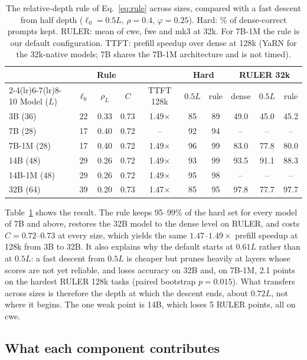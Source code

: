 \documentclass[10pt,conference]{IEEEtran}
\begin{document}
\begin{table}[t]
\centering
\caption{The relative-depth rule of Eq.~\eqref{eq:rule} across sizes, compared with a fast descent from half depth ($\ell_0=0.5L$, $\rho=0.4$, $\varphi=0.25$). Hard: \% of dense-correct prompts kept. RULER: mean of cwe, fwe and mk3 at 32k. For 7B-1M the rule is our default configuration. TTFT: prefill speedup over dense at 128k (YaRN for the 32k-native models; 7B shares the 7B-1M architecture and is not timed).}
\label{tab:rule}
\setlength{\tabcolsep}{5pt}
\small
\begin{tabular}{l ccc c cc ccc}
\toprule
& \multicolumn{3}{c}{Rule} & & \multicolumn{2}{c}{Hard} & \multicolumn{3}{c}{RULER 32k} \\
\cmidrule(lr){2-4}\cmidrule(lr){6-7}\cmidrule(lr){8-10}
Model ($L$) & $\ell_0$ & $\rho_L$ & $C$ & TTFT 128k & $0.5L$ & rule & dense & $0.5L$ & rule \\
\midrule
3B (36) & 22 & 0.33 & 0.73 & 1.49$\times$ & 85 & 89 & 49.0 & 45.0 & 45.2 \\
7B (28) & 17 & 0.40 & 0.72 & -- & 92 & 94 & -- & -- & -- \\
7B-1M (28) & 17 & 0.40 & 0.72 & 1.49$\times$ & 96 & 99 & 83.0 & 77.8 & 80.0 \\
14B (48) & 29 & 0.26 & 0.72 & 1.49$\times$ & 93 & 99 & 93.5 & 91.1 & 88.3 \\
14B-1M (48) & 29 & 0.26 & 0.72 & 1.49$\times$ & 95 & 98 & -- & -- & -- \\
32B (64) & 39 & 0.20 & 0.73 & 1.47$\times$ & 85 & 95 & 97.8 & 77.7 & 97.7 \\
\bottomrule
\end{tabular}
\end{table}

Table~\ref{tab:rule} shows the result. The rule keeps 95--99\% of the hard set for every model of 7B and above, restores the 32B model to the dense level on RULER, and costs $C=0.72$--$0.73$ at every size, which yields the same $1.47$--$1.49\times$ prefill speedup at 128k from 3B to 32B. It also explains why the default starts at $0.61L$ rather than at $0.5L$: a fast descent from $0.5L$ is cheaper but prunes heavily at layers whose scores are not yet reliable, and loses accuracy on 32B and, on 7B-1M, 2.1 points on the hardest RULER 128k tasks (paired bootstrap $p=0.015$). What transfers across sizes is therefore the depth at which the descent ends, about $0.72L$, not where it begins. The one weak point is 14B, which loses 5 RULER points, all on cwe.

\subsection{What each component contributes}
\label{sec:ablation}
\end{document}
